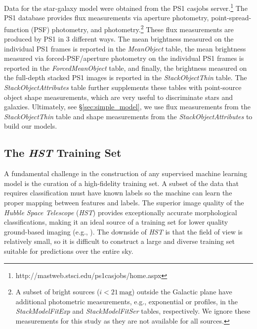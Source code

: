 \documentclass[twocolumn]{aastex62}
\begin{document}
Data for the star-galaxy model were obtained from the PS1 casjobs
server.\footnote{http://mastweb.stsci.edu/ps1casjobs/home.aspx} The PS1
database provides flux measurements via aperture photometry,
point-spread-function (PSF) photometry, and \citet{Kron80}
photometry.\footnote{A subset of bright sources ($i < 21\,\mathrm{mag}$)
outside the Galactic plane have additional photometric measurements, e.g.,
exponential or \citet{Sersic63} profiles, in the \textit{StackModelFitExp} and
\textit{StackModelFitSer} tables, respectively. We ignore these measurements
for this study as they are not available for all sources.} These flux
measurements are produced by PS1 in 3 different ways. The mean brightness
measured on the individual PS1 frames is reported in the \textit{MeanObject}
table, the mean brightness measured via forced-PSF/aperture photometry on the
individual PS1 frames is reported in the \textit{ForcedMeanObject} table, and
finally, the brightness measured on the full-depth stacked PS1 images is
reported in the \textit{StackObjectThin} table. The
\textit{StackObjectAttributes} table further supplements these tables with
point-source object shape measurements, which are very useful to discriminate
stars and galaxies. Ultimately, see \S\ref{sec:simple_model}, we use flux
measurements from the \textit{StackObjectThin} table and shape measurements
from the \textit{StackObjectAttributes} to build our models.

\subsection{The \textit{HST} Training Set} \label{sec:hst_train}

A fundamental challenge in the construction of any supervised machine learning
model is the curation of a high-fidelity training set. A subset of the data
that requires classification must have known labels so the machine can learn
the proper mapping between features and labels. The superior image quality of
the \textit{Hubble Space Telescope} (\textit{HST}) provides exceptionally
accurate morphological classifications, making it an ideal source of a training
set for lower quality ground-based imaging (e.g., \citealt{Lupton01}). The
downside of \textit{HST} is that the field of view is relatively small, so it
is difficult to construct a large and diverse training set suitable for
predictions over the entire sky.
\end{document}
